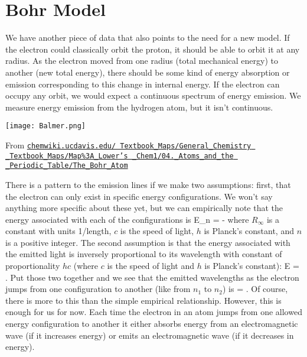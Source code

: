 \section{Bohr Model}
\label{sec:bohr}
We have another piece of data that also points to the need for a new model. If the electron could classically orbit the proton, it should be able to orbit it at any radius. As the electron moved from one radius (total mechanical energy) to another (new total energy), there should be some kind of energy absorption or emission corresponding to this change in internal energy. If the electron can occupy any orbit, we would expect a continuous spectrum of energy emission. We measure energy emission from the hydrogen atom, but it isn't continuous.
\begin{marginfigure}\centering
\texttt{[image: Balmer.png]}
\caption{From \href{http://chemwiki.ucdavis.edu/Textbook_Maps/General_Chemistry_Textbook_Maps/Map\%3A_Lower's_Chem1/04._Atoms_and_the_Periodic_Table/The_Bohr_Atom}{\texttt{chemwiki.ucdavis.edu/
Textbook\_Maps/General\_Chemistry
\_Textbook\_Maps/Map\%3A\_Lower's
\_Chem1/04.\_Atoms\_and\_the
\_Periodic\_Table/The\_Bohr\_Atom}}
}
\end{marginfigure}
There is a pattern to the emission lines if we make two assumptions: first, that the electron can only exist in specific energy configurations. We won't say anything more specific about these yet, but we can empirically note that the energy associated with each of the configurations is
\beq
E_n = -
\eeq
where $R_\infty$ is a constant with units 1/length, $c$ is the speed of light, $h$ is Planck's constant, and $n$ is a positive integer. The second assumption is that the energy associated with the emitted light is inversely proportional to its wavelength with constant of proportionality $hc$ (where $c$ is the speed of light and $h$ is Planck's constant):
\beq
E = .
\eeq
Put those two together and we see that the emitted wavelengths as the electron jumps from one configuration to another (like from $n_1$ to $n_2$) is
\beq
{} = .
\eeq{}%
Of course, there is more to this than the simple empirical relationship. However, this is enough for us for now. Each time the electron in an atom jumps from one allowed energy configuration to another it either absorbs energy from an electromagnetic wave (if it increases energy) or emits an electromagnetic wave (if it decreases in energy).

